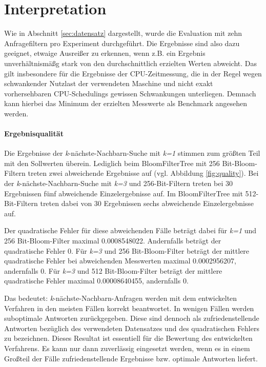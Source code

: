 \section{Interpretation}\label{sec:interpretation}
Wie in Abschnitt \ref{sec:datensatz} dargestellt, wurde die Evaluation mit zehn Anfragefiltern pro Experiment durchgeführt. Die Ergebnisse sind also dazu geeignet, etwaige Ausreißer zu erkennen, wenn z.B. ein Ergebnis unverhältnismäßg stark von den durchschnittlich erzielten Werten abweicht. Das gilt insbesondere für die Ergebnisse der CPU-Zeitmessung, die in der Regel wegen schwankender Nutzlast der verwendeten Maschine und nicht exakt vorhersehbaren CPU-Schedulings gewissen Schwankungen unterliegen. Demnach kann hierbei das Minimum der erzielten Messwerte als Benchmark angesehen werden. 
\paragraph*{Ergebnisqualität}
Die Ergebnisse der \textit{k}-nächste-Nachbarn-Suche mit \textit{k=1} stimmen zum größten Teil mit den Sollwerten überein. Lediglich beim BloomFilterTree mit 256 Bit-Bloom-Filtern treten zwei abweichende Ergebnisse auf (vgl. Abbildung \ref{fig:quality}). Bei der \textit{k}-nächste-Nachbarn-Suche mit \textit{k=3} und 256-Bit-Filtern treten bei 30 Ergebnissen fünf abweichende Einzelergebnisse auf. Im BloomFilterTree mit 512-Bit-Filtern treten dabei von 30 Ergebnissen sechs abweichende Einzelergebnisse auf. 

Der quadratische Fehler für diese abweichenden Fälle beträgt dabei für \textit{k=1} und 256 Bit-Bloom-Filter maximal 0.0008548022. Andernfalls beträgt der quadratische Fehler 0. Für \textit{k=3} und 256 Bit-Bloom-Filter beträgt der mittlere quadratische Fehler bei abweichenden Messwerten maximal 0.0002956207, andernfalls 0. Für \textit{k=3} und 512 Bit-Bloom-Filter beträgt der mittlere quadratische Fehler maximal 0.00008640455, andernfalls 0.

Das bedeutet: \textit{k}-nächste-Nachbarn-Anfragen werden mit dem entwickelten Verfahren in den meisten Fällen korrekt beantwortet. In wenigen Fällen werden suboptimale Antworten zurückgegeben. Diese sind dennoch als zufriedenstellende Antworten bezüglich des verwendeten Datensatzes und des quadratischen Fehlers zu bezeichnen. Dieses Resultat ist essentiell für die Bewertung des entwickelten Verfahrens. Es kann nur dann zuverlässig eingesetzt werden, wenn es in einem Großteil der Fälle zufriedenstellende Ergebnisse bzw. optimale Antworten liefert. 
